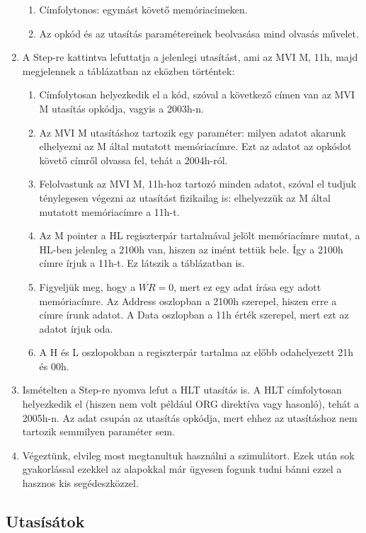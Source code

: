 \documentclass{article}
\begin{document}
\begin{enumerate}
\begin{enumerate}
		\item \colorbox{orange!30}{Címfolytonos: egymást követő memóriacímeken.}
		\item \colorbox{orange!30}{Az opkód és az utasítás paramétereinek beolvasása mind olvasás művelet.}
	\end{enumerate}
	\item A Step-re kattintva lefuttatja a jelenlegi utasítást, ami az MVI M, 11h, majd megjelennek a táblázatban az eközben történtek:
	\begin{enumerate}
		\item Címfolytosan helyezkedik el a kód, szóval a következő címen van az MVI M utasítás opkódja, vagyis a 2003h-n.
		\item Az MVI M utasításhoz tartozik egy paraméter: milyen adatot akarunk elhelyezni az M által mutatott memóriacímre. Ezt az adatot az opkódot követő címről olvassa fel, tehát a 2004h-ról.
		\item Felolvastunk az MVI M, 11h-hoz tartozó minden adatot, szóval el tudjuk ténylegesen végezni az utasítást fizikailag is: elhelyezzük az M által mutatott memóriacímre a 11h-t.
		\item Az M pointer a HL regiszterpár tartalmával jelölt memóriacímre mutat, a HL-ben jelenleg a 2100h van, hiszen az imént tettük bele. Így a 2100h címre írjuk a 11h-t. Ez látszik a táblázatban is. 
		\item Figyeljük meg, hogy a $\overline{WR} = 0$, mert ez egy adat írása egy adott memóriacímre. Az Address oszlopban a 2100h szerepel, hiszen erre a címre írunk adatot. A Data oszlopban a 11h érték szerepel, mert ezt az adatot írjuk oda.
		\item \colorbox{orange!30}{A H és L oszlopokban a  regiszterpár tartalma az előbb odahelyezett 21h és 00h.}
	\end{enumerate}
	\item Ismételten a Step-re nyomva lefut a HLT utasítás is. A HLT címfolytosan helyezkedik el (hiszen nem volt például ORG direktíva vagy hasonló), tehát a 2005h-n. Az adat csupán az utasítás opkódja, mert ehhez az utasításhoz nem tartozik semmilyen paraméter sem.
	\item Végeztünk, elvileg most megtanultuk használni a szimulátort. Ezek után sok gyakorlással ezekkel az alapokkal már ügyesen fogunk tudni bánni ezzel a hasznos kis segédeszközzel.
\end{enumerate}

\subsection{Utasísátok}
\end{document}
